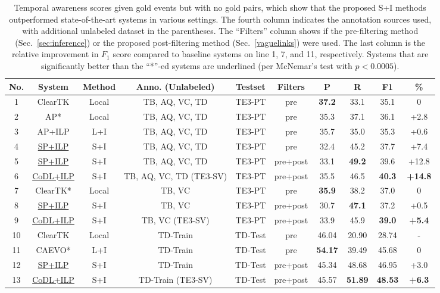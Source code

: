 \documentclass[11pt,letterpaper]{article}
\begin{document}
{\begin{table*}[htbp!]
	\centering
	\caption{\small Temporal awareness scores given gold events but with no gold pairs, which show that the proposed S+I methods outperformed state-of-the-art systems in various settings. The fourth column indicates the annotation sources used, with additional unlabeled dataset in the parentheses. The ``Filters'' column shows if the pre-filtering method (Sec.~\ref{sec:inference}) or the proposed post-filtering method (Sec.~\ref{vaguelinks}) were used. The last column is the relative improvement in $F_1$ score compared to baseline systems on line 1, 7, and 11, respectively. Systems that are significantly better than the ``*''-ed systems are underlined (per McNemar's test with $p<0.0005$).}
	\label{tab: dont know nones}
	\small
	\begin{tabular}{ c|c|c|c|c|c|c|c|c|c } 
		\hline
		No. & System & Method & Anno. (Unlabeled) & Testset & Filters	& P 	& R 	& F1 	& \%\\ 
		\hline
        \hline
		1& ClearTK & Local & TB, AQ, VC, TD &TE3-PT& pre & \textbf{37.2} 	& 33.1 	& 35.1 	& 0  \\ 
		2& AP* & Local & TB, AQ, VC, TD&TE3-PT& pre	& 35.3	& 37.1  & 36.1	& +2.8\\
		3& AP+ILP & L+I&	TB, AQ, VC, TD&TE3-PT& pre & 35.7 	& 35.0 	& 35.3 	& +0.6\\
		4& \underline{SP+ILP} 	& S+I &TB, AQ, VC, TD&TE3-PT& pre	& 32.4 	& 45.2 	& 37.7 	& +7.4 \\5& \underline{SP+ILP} &S+I & TB, AQ, VC, TD&TE3-PT& pre+post
				& 33.1 	& \textbf{49.2} 	& 39.6 	& +12.8\\6& \underline{CoDL+ILP} &S+I & TB, AQ, VC, TD (TE3-SV)&TE3-PT& pre+post
				& 35.5 	& 46.5 	& \textbf{40.3} & \textbf{+14.8}\\
		\hline
        7& ClearTK* & Local & TB, VC &TE3-PT& pre &  \textbf{35.9}	&  38.2	& 37.0	&  0\\  8& \underline{SP+ILP} &S+I & TB, VC&TE3-PT& pre+post
				& 30.7& \textbf{47.1} 	& 37.2   & +0.5 \\9& \underline{CoDL+ILP} &S+I & TB, VC (TE3-SV)&TE3-PT& pre+post
				&33.9  	&45.9  	&\textbf{39.0}  & \textbf{+5.4}\\\hline\hline
		10&ClearTK&Local&TD-Train&TD-Test&pre&46.04& 20.90 & 28.74&-\\
		11&CAEVO*&L+I&TD-Train&TD-Test&pre&\textbf{54.17}& 39.49 & 45.68 & 0\\
		12&\underline{SP+ILP}&S+I&TD-Train&TD-Test&pre+post&45.34 & 48.68 &46.95&+3.0\\
		13&\underline{CoDL+ILP}&S+I&TD-Train (TE3-SV)&TD-Test&pre+post& 45.57 & \textbf{51.89} & \textbf{48.53}& \textbf{+6.3}\\
		\hline
	\end{tabular}
\end{table*}


}
\end{document}
